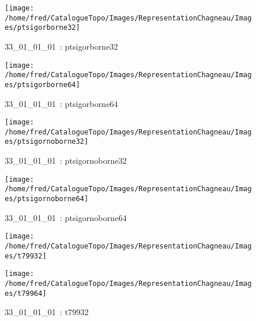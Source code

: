 \documentclass[12pt,titlepage]{book}
\begin{document}
\begin{figure}[h!]
\begin{minipage}[t]{3cm}
    \begin{center}
      \texttt{[image: /home/fred/CatalogueTopo/Images/RepresentationChagneau/Images/ptsigorborne32]}
      \caption[~33\_01\_01\_01]{\small{33\_01\_01\_01~:} \tiny{ptsigorborne32}}\label{ptsigorborne32}
    \end{center}
  \end{minipage}
  \begin{minipage}[t]{3cm}
    \begin{center}
      \texttt{[image: /home/fred/CatalogueTopo/Images/RepresentationChagneau/Images/ptsigorborne64]}
      \caption[~33\_01\_01\_01]{\small{33\_01\_01\_01~:} \tiny{ptsigorborne64}}\label{ptsigorborne64}
    \end{center}
  \end{minipage}
  \begin{minipage}[t]{3cm}
    \begin{center}
      \texttt{[image: /home/fred/CatalogueTopo/Images/RepresentationChagneau/Images/ptsigornoborne32]}
      \caption[~33\_01\_01\_01]{\small{33\_01\_01\_01~:} \tiny{ptsigornoborne32}}\label{ptsigornoborne32}
    \end{center}
  \end{minipage}
  \begin{minipage}[t]{3cm}
    \begin{center}
      \texttt{[image: /home/fred/CatalogueTopo/Images/RepresentationChagneau/Images/ptsigornoborne64]}
      \caption[~33\_01\_01\_01]{\small{33\_01\_01\_01~:} \tiny{ptsigornoborne64}}\label{ptsigornoborne64}
    \end{center}
  \end{minipage}
  \begin{minipage}[t]{3cm}
    \begin{center}
      \texttt{[image: /home/fred/CatalogueTopo/Images/RepresentationChagneau/Images/t79932]}
      \caption[~33\_01\_01\_01]{\small{33\_01\_01\_01~:} \tiny{t79932}}\label{t79932}
    \end{center}
  \end{minipage}
  \begin{minipage}[t]{3cm}
    \begin{center}
      \texttt{[image: /home/fred/CatalogueTopo/Images/RepresentationChagneau/Images/t79964]}

\end{center}
\end{minipage}
\end{figure}
\end{document}
